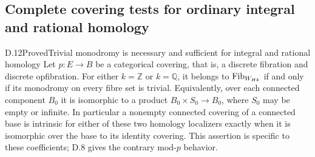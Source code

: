 \subsection{Complete covering tests for ordinary integral and rational homology}
\begin{claim}{D.12}{Proved}{Trivial monodromy is necessary and sufficient for integral and rational homology}
Let $p:E\to B$ be a categorical covering, that is, a discrete fibration and discrete opfibration. For either $k=\mathbb Z$ or $k=\mathbb Q$, it belongs to $\mathrm{Fib}_{W_{Hk}}$ if and only if its monodromy on every fibre set is trivial. Equivalently, over each connected component $B_0$ it is isomorphic to a product $B_0\times S_0\to B_0$, where $S_0$ may be empty or infinite. In particular a nonempty connected covering of a connected base is intrinsic for either of these two homology localizers exactly when it is isomorphic over the base to its identity covering. This assertion is specific to these coefficients; D.8 gives the contrary mod-$p$ behavior.
\end{claim}
